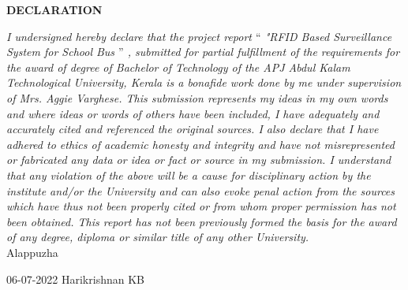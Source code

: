 \begin{titlepage}
	\begin{center}
		\textbf{\LARGE{DECLARATION }}\\[0.5cm]
	\end{center}
\onehalfspacing
\textit{\emph{I undersigned hereby declare that the project report {$“$ "RFID Based Surveillance System for School Bus
 $”$} , submitted for partial fulfillment of the requirements for the award of degree of Bachelor of Technology of the APJ Abdul Kalam Technological University, Kerala is a bonafide work done by me under supervision of Mrs. Aggie Varghese. This submission represents my ideas in my own words and where ideas or words of others have been included, I have adequately and accurately cited and referenced the original sources. I  also declare that I have adhered to ethics of academic honesty and integrity and have not misrepresented or fabricated any data or idea or fact or source in my submission. I understand that any violation of the above will be a cause for disciplinary action by the institute and/or the University and can also evoke penal action from the sources which have thus not been properly cited or from whom proper permission has not been obtained. This report has not been previously formed the basis for the award of any degree, diploma or similar title of any other University.}}
\\
	\hspace{0.2cm}
Alappuzha
	\vspace{0.2cm}
\par
\hspace{0.1cm}
06-07-2022
\vspace{2cm}
\hspace{8cm}
               Harikrishnan KB

\end{titlepage}